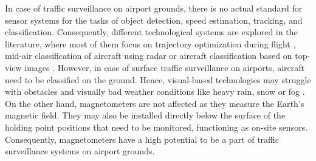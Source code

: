 In case of traffic surveillance on airport grounds, there is no actual standard for sensor systems for the tasks of object detection, speed estimation, tracking, and classification. Consequently, different technological systems are explored in the literature, where most of them focus on trajectory optimization during flight \cite{ref:tian2020}, mid-air classification of aircraft using radar \cite{ref:xia2022} or aircraft classification based on top-view images \cite{ref:gao2022,ref:azam2021}. %
However, in case of surface traffic surveillance on airports, aircraft need to be classified on the ground. Hence, visual-based technologies may struggle with obstacles and visually bad weather conditions like heavy rain, snow or fog \cite{ref:zhang2023}. On the other hand, magnetometers are not affected as they measure the Earth's magnetic field. They may also be installed directly below the surface of the holding point positions that need to be monitored, functioning as on-site sensors. Consequently, magnetometers have a high potential to be a part of traffic surveillance systems on airport grounds.   

